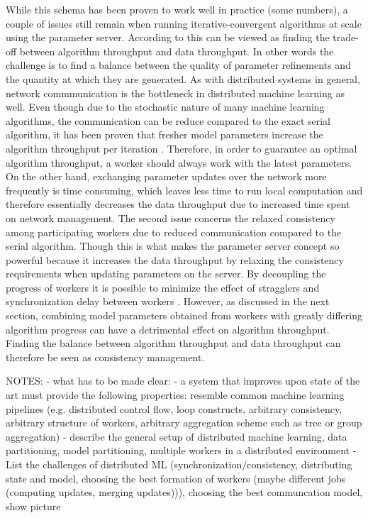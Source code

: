 While this schema has been proven to work well in practice (some numbers), a couple of issues still remain when running iterative-convergent algorithms at scale using the parameter server.
According to \cite{wei2015managed} this can be viewed as finding the trade-off between algorithm throughput and data throughput.
In other words the challenge is to find a balance between the quality of parameter refinements and the quantity at which they are generated.
As with distributed systems in general, network commmunication is the bottleneck in distributed machine learning as well.
Even though due to the stochastic nature of many machine learning algorithms, the communication can be reduce compared to the exact serial algorithm, it has been proven that fresher model parameters increase the algorithm throughput per iteration \cite{langford2009slow}.
Therefore, in order to guarantee an optimal algorithm throughput, a worker should always work with the latest parameters.
On the other hand, exchanging parameter updates over the network more frequently is time consuming, which leaves less time to run local computation and therefore essentially decreases the data throughput due to increased time spent on network management.
The second issue concerns the relaxed consistency among participating workers due to reduced communication compared to the serial algorithm.
Though this is what makes the parameter server concept so powerful because it increases the data throughput by relaxing the consistency requirements when updating parameters on the server.
By decoupling the progress of workers it is possible to minimize the effect of stragglers and synchronization delay between workers \cite{ananthanarayanan2013effective}.
However, as discussed in the next section, combining model parameters obtained from workers with greatly differing algorithm progress can have a detrimental effect on algorithm throughput.
Finding the balance between algorithm throughput and data throughput can therefore be seen as consistency management.

NOTES:
- what has to be made clear:
	- a system that improves upon state of the art must provide the following properties: resemble common machine learning pipelines (e.g. distributed control flow, loop constructs, arbitrary consistency, arbitrary structure of workers, arbitrary aggregation scheme such as tree or group aggregation)
- describe the general setup of distributed machine learning, data partitioning, model partitioning, multiple workers in a distributed environment
- List the challenges of distributed ML (synchronization/consistency, distributing state and model, choosing the best formation of workers (maybe different jobs (computing updates, merging updates))), choosing the best communcation model, show picture


